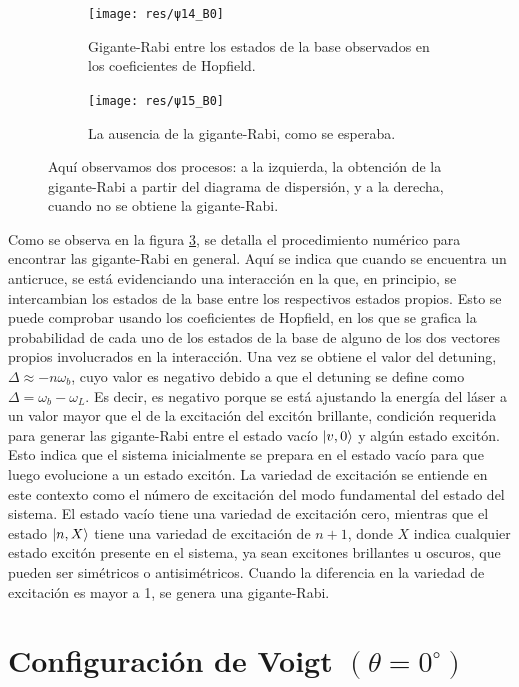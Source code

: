 \documentclass[main.tex]{subfiles}
\begin{document}
\begin{figure}[htbp]
	\begin{subfigure}[b]{0.49\textwidth}
		\centering
		\texttt{[image: res/ψ14\_B0]}
		\caption{Gigante-Rabi entre los estados de la base observados en los coeficientes de Hopfield.}
		\label{fig:ψ14_B0}
	\end{subfigure}
	\hfill
	\begin{subfigure}[b]{0.49\textwidth}
		\centering
		\texttt{[image: res/ψ15\_B0]}
		\caption{La ausencia de la gigante-Rabi, como se esperaba.}
		\label{fig:ψ15_B0}
	\end{subfigure}
	\caption{Aquí observamos dos procesos: a la izquierda, la obtención de la gigante-Rabi a partir del diagrama de dispersión, y a la derecha, cuando no se obtiene la gigante-Rabi.}
	\label{fig:Vladimir}
\end{figure}

Como se observa en la figura \ref{fig:Vladimir}, se detalla el procedimiento numérico para encontrar las gigante-Rabi en general. Aquí se indica que cuando se encuentra un anticruce, se está evidenciando una interacción en la que, en principio, se intercambian los estados de la base entre los respectivos estados propios. Esto se puede comprobar usando los coeficientes de Hopfield, en los que se grafica la probabilidad de cada uno de los estados de la base de alguno de los dos vectores propios involucrados en la interacción. Una vez se obtiene el valor del detuning, $\Delta \approx -n\omega_b$, cuyo valor es negativo debido a que el detuning se define como $\Delta = \omega_b - \omega_L$. Es decir, es negativo porque se está ajustando la energía del láser a un valor mayor que el de la excitación del excitón brillante, condición requerida para generar las gigante-Rabi entre el estado vacío $\ket{v,0}$ y algún estado excitón. Esto indica que el sistema inicialmente se prepara en el estado vacío para que luego evolucione a un estado excitón. La variedad de excitación se entiende en este contexto como el número de excitación del modo fundamental del estado del sistema. El estado vacío tiene una variedad de excitación cero, mientras que el estado $\ket{n,X}$ tiene una variedad de excitación de $n+1$, donde $X$ indica cualquier estado excitón presente en el sistema, ya sean excitones brillantes u oscuros, que pueden ser simétricos o antisimétricos. Cuando la diferencia en la variedad de excitación es mayor a 1, se genera una gigante-Rabi.

\section{Configuraci\'on de Voigt $(\theta = 0^\circ)$}
\end{document}
